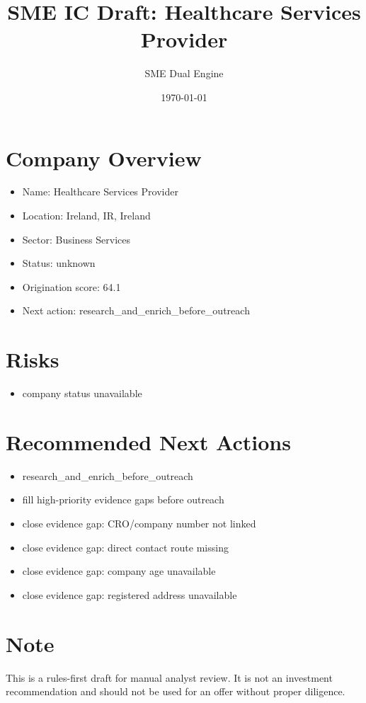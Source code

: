 \documentclass[11pt,a4paper]{article}
\title{SME IC Draft: Healthcare Services Provider}
\author{SME Dual Engine}
\date{\today}
\begin{document}
\maketitle
\section*{Company Overview}
\begin{itemize}[leftmargin=1.4em]
\item Name: Healthcare Services Provider
\item Location: Ireland, IR, Ireland
\item Sector: Business Services
\item Status: unknown
\item Origination score: 64.1
\item Next action: research\_and\_enrich\_before\_outreach
\end{itemize}
\section*{Risks}
\begin{itemize}[leftmargin=1.4em]
\item company status unavailable
\end{itemize}
\section*{Recommended Next Actions}
\begin{itemize}[leftmargin=1.4em]
\item research\_and\_enrich\_before\_outreach
\item fill high-priority evidence gaps before outreach
\item close evidence gap: CRO/company number not linked
\item close evidence gap: direct contact route missing
\item close evidence gap: company age unavailable
\item close evidence gap: registered address unavailable
\end{itemize}
\section*{Note}
This is a rules-first draft for manual analyst review. It is not an investment
recommendation and should not be used for an offer without proper diligence.
\end{document}
